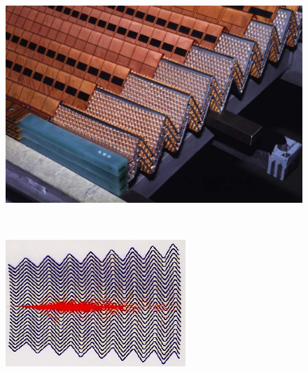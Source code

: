 \begin{english}
\begin{figure}[htp]
\begin{minipage}[b]{.59\textwidth}
    \begin{center}
    \includegraphics[width=\textwidth]{larpic}
    \end{center}
\end{minipage}
~\begin{minipage}[b]{.4\textwidth}
    \begin{center}
    \includegraphics[width=\textwidth]{shower}
    \end{center}
\end{minipage}

\begin{minipage}[t]{.59\textwidth}
    \begin{center}
    \end{center}
\end{minipage}
~\begin{minipage}[t]{.4\textwidth}
    \begin{center}
    \end{center}
\end{minipage}


\end{figure}
\end{english}
